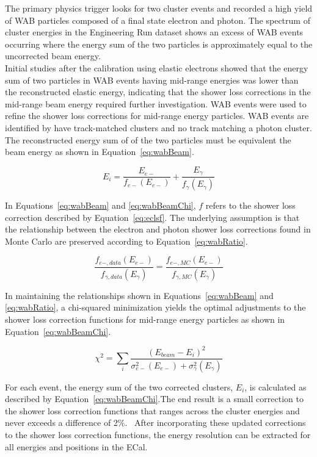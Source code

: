 The primary physics trigger looks for two cluster events and recorded a high yield of WAB particles composed of a final state electron and photon. The spectrum of cluster energies in the Engineering Run dataset shows an excess of WAB events occurring where the energy sum of the two particles is approximately equal to the uncorrected beam energy.  \\
\indent Initial studies after the calibration using elastic electrons showed that the energy sum of two particles in WAB events having mid-range energies was lower than the reconstructed elastic energy, indicating that the shower loss corrections in the mid-range beam energy required further investigation. WAB events were used to refine the shower loss corrections for mid-range energy particles. WAB events are identified by have track-matched clusters and no track matching a photon cluster. The reconstructed energy sum of of the two particles must be equivalent the beam energy as shown in Equation~\eqref{eq:wabBeam}.~\cite{szumila-vance_hps_2016}

\begin{equation}
	\label{eq:wabBeam}
	E_i = \dfrac{E_{e-}}{f_{e-}(E_{e-})}+\dfrac{E_{\gamma}}{f_{\gamma}(E_{\gamma})}
\end{equation}

In Equations~\eqref{eq:wabBeam} and \eqref{eq:wabBeamChi}, $f$ refers to the shower loss correction described by Equation~\eqref{eq:eclsf}. The underlying assumption is that the relationship between the electron and photon shower loss corrections found in Monte Carlo are preserved according to Equation~\eqref{eq:wabRatio}.

\begin{equation}
	\label{eq:wabRatio}
	 \dfrac{f_{e-, data}(E_{e-})}{f_{\gamma, data}(E_{\gamma})}= \dfrac{f_{e-, MC}(E_{e-})}{f_{\gamma, MC}(E_{\gamma})}
\end{equation}

In maintaining the relationships shown in Equations~\eqref{eq:wabBeam} and \eqref{eq:wabRatio}, a chi-squared minimization yields the optimal adjustments to the shower loss correction functions for mid-range energy particles as shown in Equation~\eqref{eq:wabBeamChi}.

\begin{equation}
	\label{eq:wabBeamChi}
	\chi^2 =\sum_{i} \dfrac{(E_{beam}-E_i)^2}{\sigma_{e-}^2(E_{e-})+\sigma_{\gamma}^2(E_{\gamma})}	
\end{equation}

For each event, the energy sum of the two corrected clusters, $E_i$, is calculated as described by Equation~\eqref{eq:wabBeamChi}.The end result is a small correction to the shower loss correction functions that ranges across the cluster energies and never exceeds a difference of 2$\%$.~\cite{szumila-vance_hps_2016} After incorporating these updated corrections to the shower loss correction functions, the energy resolution can be extracted for all energies and positions in the ECal.  
